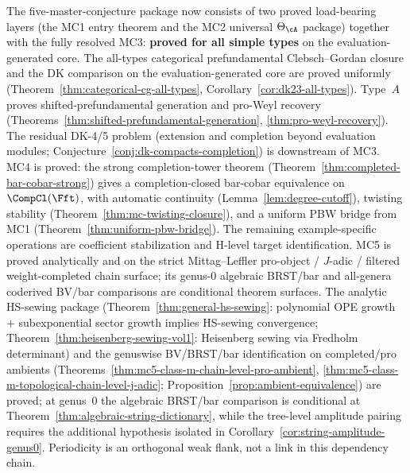 \noindent
The five-master-conjecture package now consists of two proved
load-bearing layers (the MC1 entry theorem and the MC2 universal
$\Theta_\cA$ package) together with the fully resolved
MC3: \textbf{proved for all simple types} on the evaluation-generated
core. The all-types categorical prefundamental
Clebsch--Gordan closure and the DK comparison on the
evaluation-generated core are proved uniformly
\textup{(}Theorem~\ref{thm:categorical-cg-all-types},
Corollary~\ref{cor:dk23-all-types}\textup{)}. Type~$A$
proves shifted-prefundamental generation and pro-Weyl recovery
\textup{(}Theorems~\ref{thm:shifted-prefundamental-generation},
\ref{thm:pro-weyl-recovery}\textup{)}. The residual DK-4/5
problem (extension and completion beyond evaluation modules;
Conjecture~\ref{conj:dk-compacts-completion}) is
downstream of MC3.
MC4 is proved: the strong completion-tower theorem
(Theorem~\ref{thm:completed-bar-cobar-strong}) gives a
completion-closed bar-cobar equivalence on $\CompCl(\Fft)$, with
automatic continuity (Lemma~\ref{lem:degree-cutoff}), twisting
stability (Theorem~\ref{thm:mc-twisting-closure}), and a uniform PBW
bridge from MC1 (Theorem~\ref{thm:uniform-pbw-bridge}).
The remaining example-specific operations are coefficient stabilization and
H-level target identification.
MC5 is proved analytically and on the strict Mittag--Leffler
pro-object / $J$-adic / filtered weight-completed chain surface; its
genus-$0$ algebraic BRST/bar and all-genera coderived BV/bar
comparisons are conditional theorem surfaces. The analytic
HS-sewing package
\textup{(}Theorem~\ref{thm:general-hs-sewing}: polynomial OPE growth
$+$ subexponential sector growth implies HS-sewing convergence;
Theorem~\ref{thm:heisenberg-sewing-vol1}: Heisenberg sewing via
Fredholm determinant\textup{)} and the genuswise BV/BRST/bar
identification on completed/pro ambients
\textup{(}Theorems~\ref{thm:mc5-class-m-chain-level-pro-ambient},
\ref{thm:mc5-class-m-topological-chain-level-j-adic};
Proposition~\ref{prop:ambient-equivalence}\textup{)} are proved; at
genus~$0$ the algebraic BRST/bar comparison is conditional at
Theorem~\ref{thm:algebraic-string-dictionary},
while the tree-level amplitude pairing requires the additional
hypothesis isolated in
Corollary~\ref{cor:string-amplitude-genus0}. Periodicity is an
orthogonal weak flank, not a link in this dependency chain.

